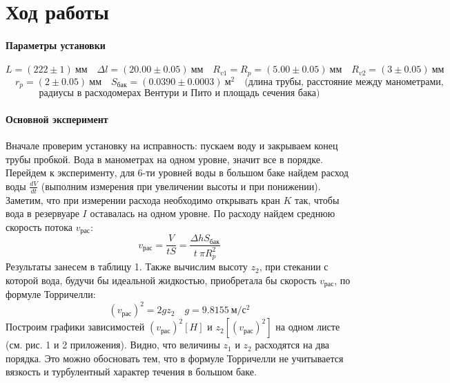 \documentclass[a4paper, 12pt]{article}
\begin{document}
\section{Ход работы}
\paragraph{Параметры установки}
\[ L = (222 \pm 1) \: мм \quad \Delta l = (20.00 \pm 0.05) \: мм \quad R_{v1} = R_p = (5.00 \pm 0.05)\: мм\quad R_{v2} = (3 \pm 0.05) \: мм \]\[\quad r_p = (2 \pm 0.05) \: мм \quad S_{бак} = (0.0390 \pm 0.0003) \: м^2
\quad \text{(длина трубы, расстояние между манометрами, }\]
\[\text{радиусы в расходомерах Вентури и Пито и площадь сечения бака)}\]
\paragraph{Основной эксперимент}
Вначале проверим установку на исправность: пускаем воду и закрываем конец трубы пробкой. Вода в манометрах на одном уровне, значит все в порядке. Перейдем к эксперименту, для 6-ти уровней воды в большом баке найдем расход воды $\frac{dV}{dt}$ (выполним измерения при увеличении высоты и при понижении). Заметим, что при измерении  расхода необходимо открывать кран $K$ так, чтобы вода в резервуаре $I$ оставалась на одном уровне. По расходу найдем среднюю скорость потока $v_{рас}$:
\[ v_{рас} = \frac{V}{t S} = \frac{\Delta h S_{бак}}{t \: \pi R^2_p}\]
Результаты занесем в таблицу 1. Также вычислим высоту $z_2$, при стекании с которой вода, будучи бы идеальной жидкостью, приобретала бы скорость $v_{рас}$, по формуле Торричелли:
\[ (v_{рас})^2 = 2 g z_2 \quad g = 9.8155 \: м/с^2\]
Построим графики зависимостей $(v_{рас})^2[H]$ и $z_2[(v_{рас})^2]$ на одном листе (см. рис. 1 и 2 приложения).
Видно, что величины $z_1$ и $z_2$ расходятся на два порядка. Это можно обосновать тем, что в формуле Торричелли не учитывается вязкость и турбулентный характер течения в большом баке.
\end{document}
